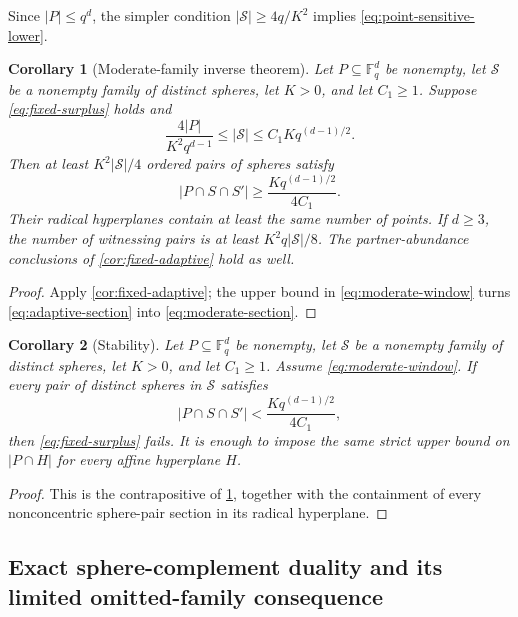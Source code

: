 \documentclass[11pt,letterpaper]{amsart}
\newtheorem{corollary}[corollary]{Corollary}
\theoremstyle{definition}
\theoremstyle{remark}
\newcommand{\1}{\mathbf 1}
\begin{document}
Since $|P|\le q^d$, the simpler condition $|\mathcal S|\ge4q/K^2$ implies \eqref{eq:point-sensitive-lower}.

\begin{corollary}[Moderate-family inverse theorem]\label{cor:moderate}
Let $P\subseteq\mathbb F_q^d$ be nonempty, let $\mathcal S$ be a nonempty family of distinct spheres, let $K>0$, and let $C_1\ge1$.  Suppose \eqref{eq:fixed-surplus} holds and
\begin{equation}\label{eq:moderate-window}
 \frac{4|P|}{K^2q^{d-1}}
 \le|\mathcal S|
 \le C_1Kq^{(d-1)/2}.
\end{equation}
Then at least $K^2|\mathcal S|/4$ ordered pairs of spheres satisfy
\begin{equation}\label{eq:moderate-section}
 |P\cap S\cap S'|\ge
 \frac{Kq^{(d-1)/2}}{4C_1}.
\end{equation}
Their radical hyperplanes contain at least the same number of points.  If $d\ge3$, the number of witnessing pairs is at least $K^2q|\mathcal S|/8$.  The partner-abundance conclusions of \cref{cor:fixed-adaptive} hold as well.
\end{corollary}

\begin{proof}
Apply \cref{cor:fixed-adaptive}; the upper bound in \eqref{eq:moderate-window} turns \eqref{eq:adaptive-section} into \eqref{eq:moderate-section}.
\end{proof}

\begin{corollary}[Stability]\label{cor:stability}
Let $P\subseteq\mathbb F_q^d$ be nonempty, let $\mathcal S$ be a nonempty family of distinct spheres, let $K>0$, and let $C_1\ge1$.  Assume \eqref{eq:moderate-window}.  If every pair of distinct spheres in $\mathcal S$ satisfies
\[
 |P\cap S\cap S'|<\frac{Kq^{(d-1)/2}}{4C_1},
\]
then \eqref{eq:fixed-surplus} fails.  It is enough to impose the same strict upper bound on $|P\cap H|$ for every affine hyperplane $H$.
\end{corollary}

\begin{proof}
This is the contrapositive of \cref{cor:moderate}, together with the containment of every nonconcentric sphere-pair section in its radical hyperplane.
\end{proof}

\subsection{Exact sphere-complement duality and its limited omitted-family consequence}
\end{document}
